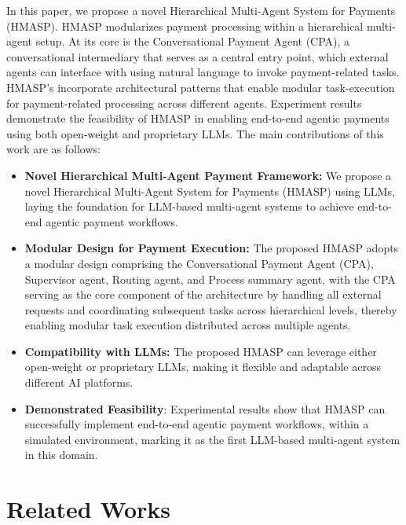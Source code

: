 \documentclass[runningheads]{llncs}
\begin{document}
In this paper, we propose a novel Hierarchical Multi-Agent System for Payments (HMASP). HMASP modularizes payment processing within a hierarchical multi-agent setup. At its core is the Conversational Payment Agent (CPA), a conversational intermediary that serves as a central entry point, which external agents can interface with using natural language to invoke payment-related tasks. 
HMASP's incorporate architectural patterns that enable modular task-execution for payment-related processing across different agents. Experiment results demonstrate the feasibility of HMASP in enabling end-to-end agentic payments using both open-weight and proprietary LLMs. The main contributions of this work are as follows:

\begin{itemize}
    \item \textbf{Novel Hierarchical Multi-Agent Payment Framework:}
    We propose a novel Hierarchical Multi-Agent System for Payments (HMASP) using LLMs, laying the foundation for LLM-based multi-agent systems to achieve end-to-end agentic payment workflows.
    \item \textbf{Modular Design for Payment Execution:}
    The proposed HMASP adopts a modular design comprising the Conversational Payment Agent (CPA), Supervisor agent, Routing agent, and Process summary agent, with the CPA serving as the core component of the architecture by handling all external requests and coordinating subsequent tasks across hierarchical levels, thereby enabling modular task execution distributed across multiple agents.
    \item \textbf{Compatibility with LLMs:} The proposed HMASP can leverage either open-weight or proprietary LLMs, making it flexible and adaptable across different AI platforms.
    \item \textbf{Demonstrated Feasibility}: Experimental results show that HMASP can successfully implement end-to-end agentic payment workflows, within a simulated environment, marking it as the first LLM-based multi-agent system in this domain.
\end{itemize}


\section{Related Works}
\end{document}
